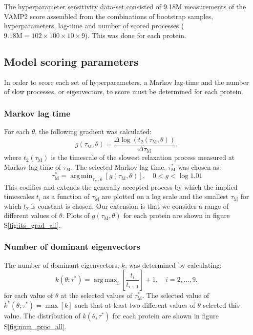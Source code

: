 \documentclass[journal=jacsat,manuscript=article]{achemso}
\DeclareMathOperator*{\argmax}{arg\,max}
\DeclareMathOperator*{\argmin}{arg\,min}
\newcommand*\sref[1]{%
    S\ref{#1}}
\begin{document}
The hyperparameter sensitivity data-set consisted of 9.18M measurements of the VAMP2 score assembled from the combinations of bootstrap samples, hyperparameters, lag-time and number of scored processes  ($9.18\mathrm{M}=102 \times 100 \times 10 \times 9$). This was done for each protein. 

\subsection{Model scoring parameters}\label{model_score_params}
In order to score each set of hyperparameters, a Markov lag-time and the number of slow processes, or eigenvectors, to score must be determined for each protein. 

\subsubsection{Markov lag time}
For each $\theta$, the following gradient was calculated:
\begin{equation}
    g(\tau_{\mathrm{M}}, \theta) = \frac{\Delta \log{\left(t_{2}(\tau_{\mathrm{M}}, \theta)\right)}}{\Delta \tau_{\mathrm{M}}}, 
\end{equation}
where $t_{2}(\tau_{\mathrm{M}})$ is the timescale of the slowest relaxation process measured at Markov lag-time of $\tau_{\mathrm{M}}$. The selected Markov lag-time, $\tau^{*}_{\mathrm{M}}$ was chosen as:
\begin{equation}
    \tau^{*}_{\mathrm{M}}  = \argmin_{\tau_{\mathrm{M}}, \theta}\left[g(\tau_{\mathrm{M}}, \theta)\right], \quad 0 < g < \log{1.01}
\end{equation}
This codifies and extends the generally accepted process by which the implied timescales $t_{i}$ as a function of $\tau_{\mathrm{M}}$ are plotted on a log scale and the smallest $\tau_{\mathrm{M}}$ for which $t_{2}$ is constant is chosen. Our extension is that we consider a range of different values of $\theta$. Plots of $g(\tau_{\mathrm{M}}, \theta)$ for each protein are shown  in figure \sref{fig:its_grad_all}. 

\subsubsection{Number of dominant eigenvectors}\label{sec:num_dom_evs}
The number of dominant eigenvectors, $k$, was determined by calculating:
\begin{equation}
    k(\theta; \tau^{*}) = \argmax_{i}{\left[\frac{t_{i}}{t_{i+1}}\right]} + 1, \quad i = 2, \ldots, 9, 
\end{equation}
for each value of $\theta$ at the selected values of $\tau^{*}_{\mathrm{M}}$. The selected value of $k^{*}(\theta; \tau^{*}) = \max{\left[k\right]}$ such that at least two different values of $\theta$  selected this value. The distribution of $k(\theta, \tau^{*})$ for each protein are shown in figure \sref{fig:num_proc_all}. 
\end{document}
